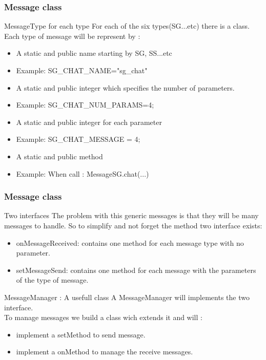 \documentclass[9pt]{beamer}
\begin{document}
\begin{frame}
	\frametitle{ Message class }

	\begin{block}{MessageType for each type}
		For each of the six types(SG...etc) there is a class.
		Each type of message will be represent by :
		\begin{itemize}
			\item<2->  A static and public name starting by SG, SS...etc
			\item<3-> Example: \color{red} SG\_CHAT\_NAME="sg\_chat"
			\item<2->  A static and public integer which specifies the number of parameters.
			\item<4-> Example: \color{red} SG\_CHAT\_NUM\_PARAMS=4;
			\item<2->  A static and public integer for each parameter
			\item<5-> Example: \color{red} SG\_CHAT\_MESSAGE = 4;
			\item<2->  A static and public method 
			\item<6-> Example: When call :\color{red} MessageSG.chat(...)
		\end{itemize}
	\end{block}
	\transdissolve
\end{frame}

\begin{frame}
	\frametitle{ Message class }

	\begin{block}{Two interfaces}
		The problem with this generic messages is that they will be many messages
		to handle.
		So to simplify and not forget the method two interface exists:
		\begin{itemize}
			\item onMessageReceived: contains one method for each message type with no parameter.
			\item setMessageSend: contains one method for each message with the parameters of the type of message.
		\end{itemize}
	\end{block}
	\begin{block}{MessageManager : A usefull class}
		A MessageManager will implements the two interface. \\
		To manage messages we build a class wich extends it and will :
		\begin{itemize}	
			\item implement a setMethod to send message.
			\item implement a onMethod to manage the receive messages.
		\end{itemize}
	\end{block}
	\transdissolve
\end{frame}
\end{document}
